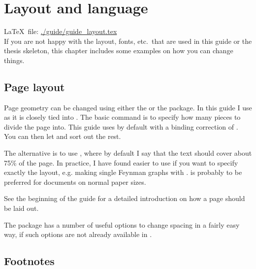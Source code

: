 \chapter{Layout and language}
\label{sec:layout}

\LaTeX\ file: \url{./guide/guide_layout.tex}\\[1ex]
\noindent
If you are not happy with the layout, fonts, etc.\ that are used in
this guide or the thesis skeleton, this chapter includes some examples
on how you can change things.


\section{Page layout}
\label{sec:layout:page}


Page geometry can be changed using either the
 or the 
package. In this guide I use  as it is closely tied
into \KOMAScript. The basic command is to specify how many pieces to
divide the page into. This guide uses  by default with
a binding correction of .  You can then let
\KOMAScript{} and  sort out the rest.

The alternative is to use , where by default I say
that the text should cover about 75\% of the page. In practice, I have
found  easier to use if you want to specify exactly
the layout, e.g. making single Feynman graphs with
.  is probably to be preferred for
documents on normal paper sizes.

See the beginning of the \KOMAScript{} guide for a detailed
introduction on how a page should be laid out.

The  package has a number of useful options to change
spacing in a fairly easy way, if such options are not already
available in \KOMAScript.


\section{Footnotes}
\label{sec:layout:footnote}

